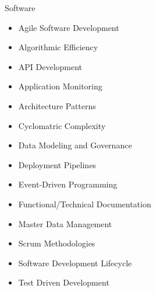 \begin{multicols*}{3}
\Competencies
{Software}
{\begin{itemize}
    \item Agile Software Development
    \item Algorithmic Efficiency
    \item API Development
    \item Application Monitoring
    \item Architecture Patterns
    \item Cyclomatric Complexity
    \item Data Modeling and Governance
    \item Deployment Pipelines
    \item Event-Driven Programming
    \item Functional/Technical Documentation
    \item Master Data Management
    \item Scrum Methodologies
    \item Software Development Lifecycle
    \item Test Driven Development
\end{itemize}}
\end{multicols*}
